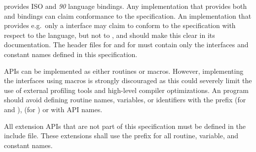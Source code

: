 \openshmem provides ISO \Clang{} and \Fortran{} \textit{90} language bindings.
Any implementation that provides both \Clang{} and \Fortran{} bindings can claim
conformance to the specification. An implementation that provides e.g.\ only a
\Clang{} interface may claim to conform to the \openshmem specification with
respect to the \Clang{} language, but not to \Fortran, and should make this
clear in its documentation. The \openshmem header files  for
\Clang{} and  for \Fortran{}
must contain only the interfaces and constant names defined in this
specification.

\openshmem \ac{API}s can be implemented as either routines or macros. However,
implementing the interfaces using macros is strongly discouraged as this could
severely limit the use of external profiling tools and high-level compiler
optimizations. An \openshmem program should avoid defining routine names,
variables, or identifiers with the prefix \shmemprefix (for \Clang{} and
\Fortran), \shmemprefixC (for \Clang) or with \openshmem \ac{API} names.

All \openshmem extension \ac{API}s that are not part of this specification must
be defined in the  include file. These extensions shall use the
 prefix for all routine, variable, and constant names.
